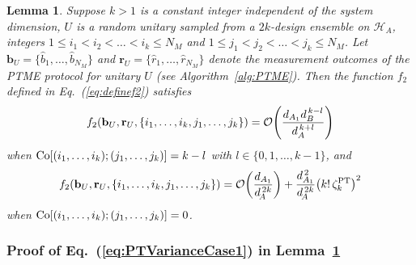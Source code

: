 \documentclass[aps,prl,twocolumn,nofootinbib,superscriptaddress,10pt]{revtex4-2}
\let\originalleft\left
\let\originalright\right
\renewcommand{\left}{\mathopen{}\mathclose\bgroup\originalleft}
\renewcommand{\right}{\aftergroup\egroup\originalright}
\newcommand{\bigo}[1]{\mathcal{O}\left(#1\right)}
\theoremstyle{plain}
\newtheorem{lemma}{Lemma}
\theoremstyle{definition}
\newcommand{\PT}{\mathrm{PT}}
\newcommand{\caH}{\mathcal{H}}
\newcommand{\eref}[1]{Eq.~\textup{(\ref{#1})}}
\newcommand{\lref}[1]{Lemma~\ref{#1}}
\begin{document}
\begin{lemma}\label{lem:PTVarianceCases}
Suppose $k>1$ is a constant integer independent of the system dimension, $U$ is a random unitary  sampled from a $2k$-design ensemble on $\caH_A$, integers $1\leq i_1< i_2<\dots<i_k\leq N_M$ and $1\leq j_1<j_2<\dots<j_k\leq N_M$. 
Let
$\mathbf{b}_{U} = \big\{\hat{b}_1, \dots, \hat{b}_{N_M}\big\}$ and $\mathbf{r}_{U} = \{\hat{r}_1, \dots, \hat{r}_{N_M}\}$ denote the measurement outcomes of the PTME protocol for unitary $U$ (see Algorithm~\ref{alg:PTME}). 
Then the function $f_2$ defined in \eref{eq:definef2} satisfies 
\begin{align}\label{eq:PTVarianceCase1}
f_2\left( \mathbf{b}_{U},\mathbf{r}_{U},\left\lbrace i_1,\dots,i_k,j_1,\dots,j_k\right\rbrace \right)
=
\bigo{ \frac{d_{A_1} d_B^{\,k-l}}{d_A^{\,k+l} } }
\end{align}
when ${\rm Co}[(i_1,\dots,i_k);(j_1,\dots,j_k)]=k-l$ with $l\in\{0,1,\dots,k-1\}$, and 
\begin{align}\label{eq:PTVarianceCase2}
f_2\left( \mathbf{b}_{U},\mathbf{r}_{U},\left\lbrace i_1,\dots,i_k,j_1,\dots,j_k\right\rbrace \right)
=
\bigo{ \frac{d_{A_1}}{d_{\!A}^{\,2k}} }+ \frac{d_{A_1}^{\,2}}{d_{\!A}^{\,2k}} \left( k!\,\zeta_k^{\PT}\right)^2
\end{align}
when ${\rm Co}[(i_1,\dots,i_k);(j_1,\dots,j_k)]=0$. 
\end{lemma}

\subsubsection{Proof of \eref{eq:PTVarianceCase1} in \lref{lem:PTVarianceCases}}
\end{document}
